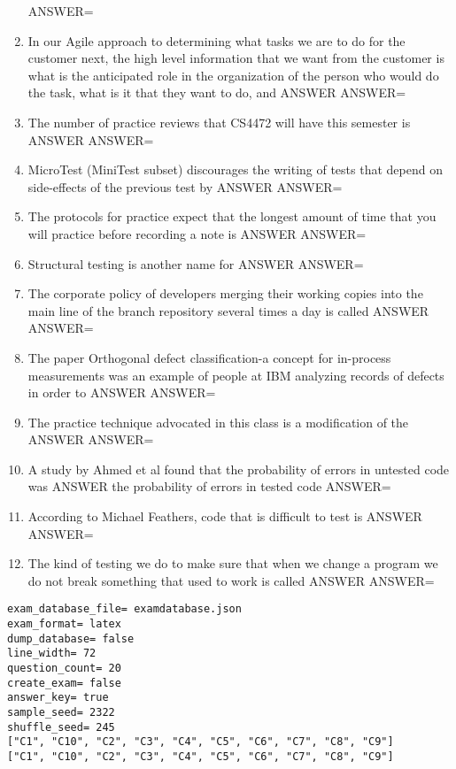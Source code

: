 \documentclass{exam}
\begin{document}
\begin{enumerate}
ANSWER=
\item In our Agile approach to determining what tasks we are to do for the customer next, the high level information that we want from the customer is what is the anticipated role in the organization of the person who would do the task, what is it that they want to do, and ANSWER\newline
ANSWER=
\item The number of practice reviews that CS4472 will have this semester is ANSWER\newline
ANSWER=
\item MicroTest (MiniTest subset) discourages the writing of tests that depend on side-effects of the previous test by ANSWER\newline
ANSWER=
\item The protocols for practice expect that the longest amount of time that you will practice before recording a note is ANSWER\newline
ANSWER=
\item Structural testing is another name for ANSWER\newline
ANSWER=
\item The corporate policy of developers merging their working copies into the main line of the branch repository several times a day is called ANSWER\newline
ANSWER=
\item The paper Orthogonal defect classification-a concept for in-process measurements was an example of people at IBM analyzing records of defects in order to ANSWER\newline
ANSWER=
\item The practice technique advocated in this class is a modification of the ANSWER\newline
ANSWER=
\item A study by Ahmed et al found that the probability of errors in untested code was ANSWER the probability of errors in tested code\newline
ANSWER=
\item According to Michael Feathers, code that is difficult to test is ANSWER\newline
ANSWER=
\item The kind of testing we do to make sure that when we change a program we do not break something that used to work is called ANSWER\newline
ANSWER=
\end{enumerate}
\newpage
\begin{verbatim}
exam_database_file= examdatabase.json
exam_format= latex
dump_database= false
line_width= 72
question_count= 20
create_exam= false
answer_key= true
sample_seed= 2322
shuffle_seed= 245
["C1", "C10", "C2", "C3", "C4", "C5", "C6", "C7", "C8", "C9"]
["C1", "C10", "C2", "C3", "C4", "C5", "C6", "C7", "C8", "C9"]
\end{verbatim}
\end{document}

